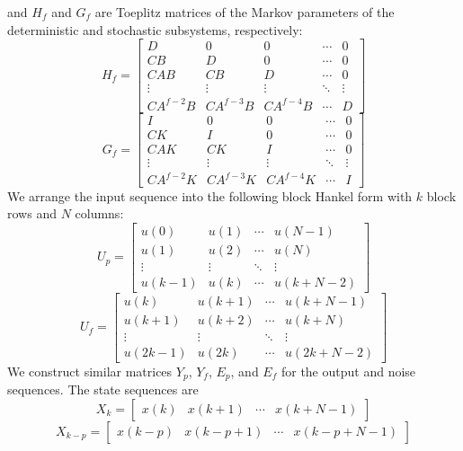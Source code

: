 and $H_f$ and $G_f$ are Toeplitz matrices of the Markov parameters of the deterministic and stochastic subsystems, respectively:
\begin{equation*}
H_f = \begin{bmatrix}
D & 0 & 0 & \cdots & 0\\
CB & D & 0 & \cdots & 0\\
CAB & CB & D & \cdots & 0\\
\vdots & \vdots  & \vdots & \ddots & \vdots\\
CA^{f-2}B & CA^{f-3}B & CA^{f-4}B & \cdots & D
\end{bmatrix}
\end{equation*}
\begin{equation*}
G_f = \begin{bmatrix}
I & 0 & 0 & \cdots & 0\\
CK & I & 0 & \cdots & 0\\
CAK & CK & I & \cdots & 0\\
\vdots & \vdots  & \vdots & \ddots & \vdots\\
CA^{f-2}K & CA^{f-3}K & CA^{f-4}K & \cdots & I
\end{bmatrix}
\end{equation*}
We arrange the input sequence into the following block Hankel form with $k$ block rows and $N$ columns:
\begin{equation*}
U_p = \begin{bmatrix}
u(0) & u(1) & \cdots & u(N-1)\\
u(1) & u(2) & \cdots & u(N)\\
\vdots & \vdots & \ddots & \vdots\\
u(k-1) & u(k) & \cdots & u(k+N-2)
\end{bmatrix}
\end{equation*}
\begin{equation*}
U_f = \begin{bmatrix}
u(k) & u(k+1) & \cdots & u(k+N-1)\\
u(k+1) & u(k+2) & \cdots & u(k+N)\\
\vdots & \vdots & \ddots & \vdots\\
u(2k-1) & u(2k) & \cdots & u(2k+N-2)
\end{bmatrix}
\end{equation*}
We construct similar matrices $Y_p$, $Y_f$, $E_p$, and $E_f$ for the output and noise sequences. The state sequences are
\begin{equation*}
X_k = \begin{bmatrix}
x(k) & x(k+1) & \cdots & x(k+N-1)
\end{bmatrix}
\end{equation*}
\begin{equation*}
X_{k-p} = \begin{bmatrix}
x(k-p) & x(k-p+1) & \cdots & x(k-p+N-1)
\end{bmatrix}
\end{equation*}


